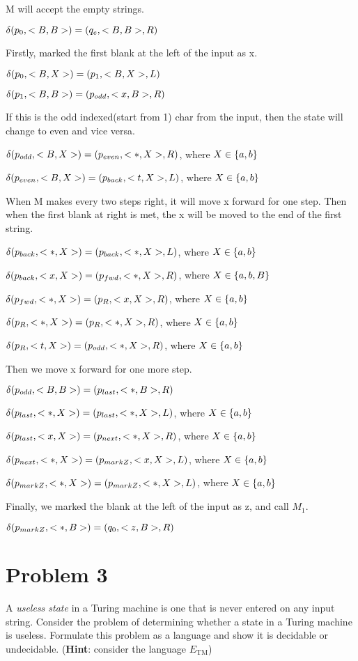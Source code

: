 \documentclass[a4paper,UTF8]{ctexart}
\theoremstyle{definition}
\begin{document}
M will accept the empty strings.

$\delta(p_0,<B,B>)=(q_e,<B,B>,R)$

Firstly, marked the first blank at the left of the input as x.

$\delta(p_0,<B,X>)=(p_1,<B,X>,L)$

$\delta(p_1,<B,B>)=(p_{odd},<x,B>,R)$

If this is the odd indexed(start from 1) char from the input, then the state will change to 
even and vice versa.

$\delta(p_{odd},<B,X>)=(p_{even},<*,X>,R)$, where $X \in \{ a,b \}$

$\delta(p_{even},<B,X>)=(p_{back},<t,X>,L)$, where $X \in \{ a,b \}$

When M makes every two steps right, it will move x forward for one step. Then when the 
first blank at right is met, the x will be moved to the end of the first string.

$\delta(p_{back},<*,X>)=(p_{back},<*,X>,L)$, where $X \in \{ a,b \}$

$\delta(p_{back},<x,X>)=(p_{fwd},<*,X>,R)$, where $X \in \{ a,b,B \}$

$\delta(p_{fwd},<*,X>)=(p_R,<x,X>,R)$, where $X \in \{ a,b \}$

$\delta(p_R,<*,X>)=(p_R,<*,X>,R)$, where $X \in \{ a,b \}$

$\delta(p_R,<t,X>)=(p_{odd},<*,X>,R)$, where $X \in \{ a,b \}$

Then we move x forward for one more step.

$\delta(p_{odd},<B,B>)=(p_{last},<*,B>,R)$

$\delta(p_{last},<*,X>)=(p_{last},<*,X>,L)$, where $X \in \{ a,b \}$

$\delta(p_{last},<x,X>)=(p_{next},<*,X>,R)$, where $X \in \{ a,b \}$

$\delta(p_{next},<*,X>)=(p_{markZ},<x,X>,L)$, where $X \in \{ a,b \}$

$\delta(p_{markZ},<*,X>)=(p_{markZ},<*,X>,L)$, where $X \in \{ a,b \}$

Finally, we marked the blank at the left of the input as z, and call $M_1$.

$\delta(p_{markZ},<*,B>)=(q_0,<z,B>,R)$



\section*{Problem 3}
A \textit{useless state} in a Turing machine is one that is never 
entered on any input string. Consider the problem of determining whether a state in a 
Turing machine is useless. Formulate this problem as a language and show it is 
decidable or undecidable. (\textbf{Hint}: consider the language $E_{\mathrm{TM}}$)
\\
\end{document}
